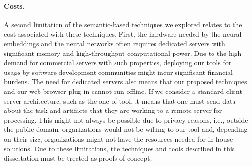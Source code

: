 \paragraph{\textbf{Costs.}}


A second limitation of the semantic-based techniques we explored
relates to the cost associated with these techniques. 
First, the hardware needed by 
the neural embeddings and the neural networks
often requires dedicated servers with significant 
memory and high-throughput computational power. Due to the high demand for commercial servers with such properties, deploying our tools for usage by software development communities might incur significant financial burdens. 
The need for dedicated servers also means that our proposed techniques and our web browser plug-in cannot run offline. If we consider a standard client-server architecture, such as the one of \acs{tool}, it means that one must send data about the task and artifacts that they are working to a remote server for processing. This might not always be possible due to privacy reasons, i.e., outside the public domain, organizations would not be willing to our tool and, depending on their size,  organizations might not have the resources needed for in-house solutions. Due to these limitations, the techniques and tools described in this dissertation 
must be treated as proofs-of-concept.

